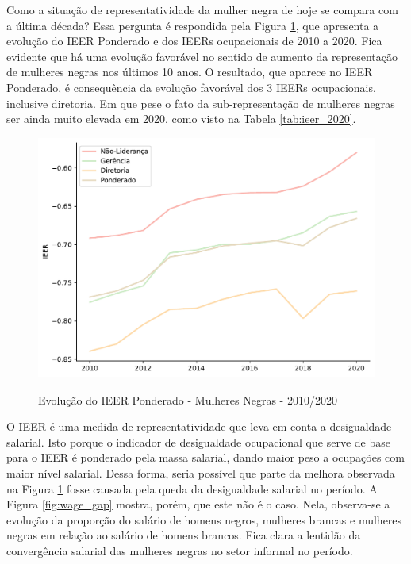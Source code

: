 \documentclass[12pt]{article}
\begin{document}
\par Como a situação de representatividade da mulher negra de hoje se compara com a última década? Essa pergunta é respondida pela Figura \ref{fig:ieer_evolution}, que apresenta a evolução do IEER Ponderado e dos IEERs ocupacionais de 2010 a 2020. Fica evidente que há uma evolução favorável no sentido de aumento da representação de mulheres negras nos últimos 10 anos. O resultado, que aparece no IEER Ponderado, é consequência da evolução favorável dos 3 IEERs ocupacionais, inclusive diretoria. Em que pese o fato da sub-representação de mulheres negras ser ainda muito elevada em 2020, como visto na Tabela \ref{tab:ieer_2020}.

\begin{figure}[H]
    \centering
    \caption{Evolução do IEER Ponderado - Mulheres Negras - 2010/2020}
        \includegraphics[height=8cm]{../figures/ieer_black_women.pdf}
    \label{fig:ieer_evolution}
\end{figure}

\par O IEER é uma medida de representatividade que leva em conta a desigualdade salarial. Isto porque o indicador de desigualdade ocupacional que serve de base para o IEER é ponderado pela massa salarial, dando maior peso a ocupações com maior nível salarial. Dessa forma, seria possível que parte da melhora observada na Figura \ref{fig:ieer_evolution} fosse causada pela queda da desigualdade salarial no período. A Figura \ref{fig:wage_gap} mostra, porém, que este não é o caso. Nela, observa-se a evolução da proporção do salário de homens negros, mulheres brancas e mulheres negras em relação ao salário de homens brancos. Fica clara a lentidão da convergência salarial das mulheres negras no setor informal no período.
\end{document}
